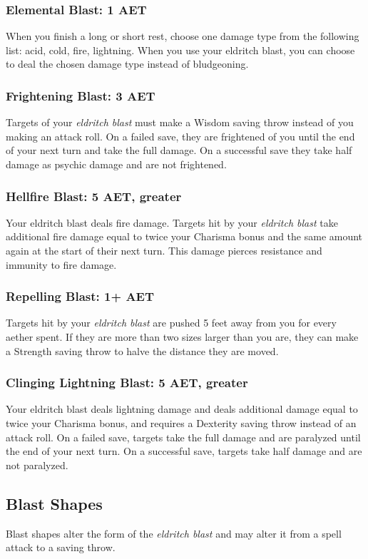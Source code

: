 \subsubsection{Elemental Blast: 1 AET}
When you finish a long or short rest, choose one damage type from the following list: acid, cold, fire, lightning. When you use your eldritch blast, you can choose to deal the chosen damage type instead of bludgeoning.

\subsubsection{Frightening Blast: 3 AET}
Targets of your \textit{eldritch blast} must make a Wisdom saving throw instead of you making an attack roll. On a failed save, they are frightened of you until the end of your next turn and take the full damage. On a successful save they take half damage as psychic damage and are not frightened.

\subsubsection{Hellfire Blast: 5 AET, greater}
Your eldritch blast deals fire damage. Targets hit by your \textit{eldritch blast} take additional fire damage equal to twice your Charisma bonus and the same amount again at the start of their next turn. This damage pierces resistance and immunity to fire damage.

\subsubsection{Repelling Blast: 1+ AET}
Targets hit by your \textit{eldritch blast} are pushed 5 feet away from you for every aether spent. If they are more than two sizes larger than you are, they can make a Strength saving throw to halve the distance they are moved.

\subsubsection{Clinging Lightning Blast: 5 AET, greater}
Your eldritch blast deals lightning damage and deals additional damage equal to twice your Charisma bonus, and requires a Dexterity saving throw instead of an attack roll. On a failed save, targets take the full damage and are paralyzed until the end of your next turn. On a successful save, targets take half damage and are not paralyzed.

\subsection{Blast Shapes}
Blast shapes alter the form of the \textit{eldritch blast} and may alter it from a spell attack to a saving throw.

